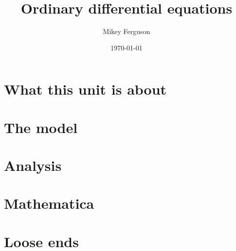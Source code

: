 \documentclass[11pt]{article}
\title{Ordinary differential equations}
\author{Mikey Ferguson}
\date{\today}
\begin{document}
\maketitle
\tableofcontents
\bigskip

\section{What this unit is about}

\section{The model}

\section{Analysis}

\section{Mathematica}

\section{Loose ends}
\end{document}
